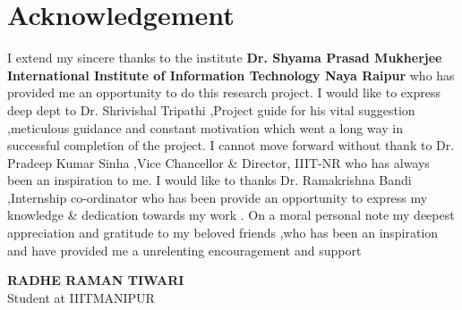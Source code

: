 \chapter*{Acknowledgement}

\thispagestyle{empty}




\begin{onehalfspace}
I extend my sincere thanks to the institute \textbf{Dr. Shyama Prasad Mukherjee International Institute of Information Technology Naya Raipur} who has provided me an opportunity to do this research project. I would like to express deep dept to Dr.  Shrivishal Tripathi ,Project guide for his vital suggestion ,meticulous guidance and constant motivation which went a long way in successful completion of the project. I cannot move forward without thank to Dr. Pradeep Kumar Sinha ,Vice Chancellor \& Director, IIIT-NR  who has always been an inspiration to me. I would like to thanks Dr. Ramakrishna Bandi ,Internship co-ordinator who has been provide an opportunity to express my knowledge \& dedication towards my work . On a moral personal note my deepest appreciation and gratitude to my beloved friends ,who has been an inspiration and have provided me a unrelenting encouragement and support
\end{onehalfspace}

\begin{flushright}
\textbf{RADHE RAMAN TIWARI}\\
Student at IIITMANIPUR
\end{flushright}

